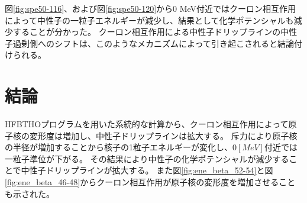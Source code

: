 \documentclass[12pt]{jarticle}
\begin{document}
図\ref{fig:spe50-116}、および図\ref{fig:spe50-120}から0 MeV付近ではクーロン相互作用によって中性子の一粒子エネルギーが減少し、結果として化学ポテンシャルも減少することが分かった。
クーロン相互作用による中性子ドリップラインの中性子過剰側へのシフトは、このようなメカニズムによって引き起こされると結論付けられる。
%

\section{結論}
HFBTHOプログラムを用いた系統的な計算から、クーロン相互作用によって原子核の変形度は増加し、中性子ドリップラインは拡大する。
斥力により原子核の半径が増加することから核子の1粒子エネルギーが変化し、$0[MeV]$付近では一粒子準位が下がる。
その結果により中性子の化学ポテンシャルが減少することで中性子ドリップラインが拡大する。
また図\ref{fig:ene_beta_52-54}と図\ref{fig:ene_beta_46-48}からクーロン相互作用が原子核の変形度を増加させることも示された。
\end{document}
